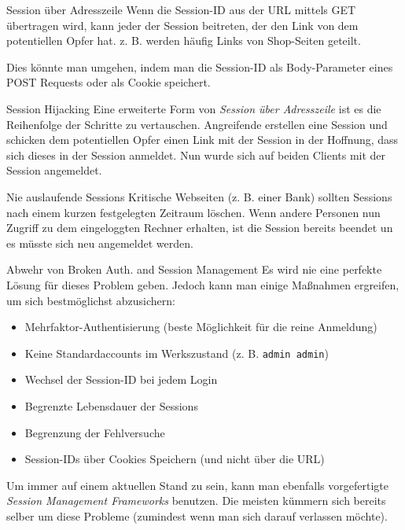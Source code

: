 \begin{example}{Session über Adresszeile}
    Wenn die Session-ID aus der URL mittels GET übertragen wird, kann jeder der Session beitreten, der den Link von dem potentiellen Opfer hat.
    z. B. werden häufig Links von Shop-Seiten geteilt.

    Dies könnte man umgehen, indem man die Session-ID als Body-Parameter eines POST Requests oder als Cookie speichert.
\end{example}

\begin{example}{Session Hijacking}
    Eine erweiterte Form von \emph{Session über Adresszeile} ist es die Reihenfolge der Schritte zu vertauschen.
    Angreifende erstellen eine Session und schicken dem potentiellen Opfer einen Link mit der Session in der Hoffnung, dass sich dieses in der Session anmeldet.
    Nun wurde sich auf beiden Clients mit der Session angemeldet.
\end{example}

\begin{example}{Nie auslaufende Sessions}
    Kritische Webseiten (z. B. einer Bank) sollten Sessions nach einem kurzen festgelegten Zeitraum löschen.
    Wenn andere Personen nun Zugriff zu dem eingeloggten Rechner erhalten, ist die Session bereits beendet un es müsste sich neu angemeldet werden.
\end{example}

\begin{bonus}{Abwehr von Broken Auth. and Session Management}
    Es wird nie eine perfekte Lösung für dieses Problem geben.
    Jedoch kann man einige Maßnahmen ergreifen, um sich bestmöglichst abzusichern:
    \begin{itemize}
        \item Mehrfaktor-Authentisierung (beste Möglichkeit für die reine Anmeldung)
        \item Keine Standardaccounts im Werkszustand (z. B. \texttt{admin admin})
        \item Wechsel der Session-ID bei jedem Login
        \item Begrenzte Lebensdauer der Sessions
        \item Begrenzung der Fehlversuche
        \item Session-IDs über Cookies Speichern (und nicht über die URL)
    \end{itemize}

    Um immer auf einem aktuellen Stand zu sein, kann man ebenfalls vorgefertigte \emph{Session Management Frameworks} benutzen.
    Die meisten kümmern sich bereits selber um diese Probleme (zumindest wenn man sich darauf verlassen möchte).
\end{bonus}

